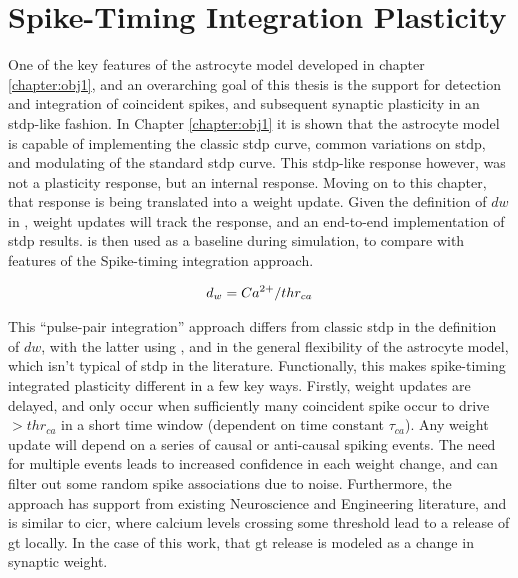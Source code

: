 
\section{Spike-Timing Integration Plasticity}

One of the key features of the astrocyte model developed in chapter
\ref{chapter:obj1}, and an overarching goal of this thesis is the support for
detection and integration of coincident spikes, and subsequent synaptic
plasticity in an \gls{stdp}-like fashion. In Chapter \ref{chapter:obj1} it is shown
that the astrocyte model is capable of
implementing the classic \gls{stdp} curve, common variations on \gls{stdp}, and modulating
of the standard \gls{stdp} curve. This \gls{stdp}-like response however, was not a
plasticity response, but an internal \ca response. Moving on to this chapter,
that \ca response is being translated into a weight update. Given the definition
of $dw$ in , weight updates will track the \ca
response, and an end-to-end implementation of \gls{stdp}
results.  is then used as a baseline during simulation, to
compare with features of the Spike-timing integration approach.

\begin{align}
  d_w = Ca^{2+} / thr_{ca}  \label{eq:dw-classic}
\end{align}

This ``pulse-pair integration'' approach differs from classic \gls{stdp} in the
definition of $dw$, with the latter using , and in the
general flexibility of the astrocyte model, which isn't typical of \gls{stdp} in the
literature. Functionally, this makes spike-timing integrated plasticity different
in a few key ways. Firstly, weight updates are delayed, and
only occur when sufficiently many coincident spike occur to drive \ca
$>thr_{ca}$ in a short time window (dependent on time constant $\tau_{ca}$). Any
weight update will depend on a series of 
causal or anti-causal spiking events. The need for multiple events leads to 
increased confidence in each weight change, and can filter out some random spike
associations due to noise.  Furthermore, the approach has support from existing
Neuroscience and Engineering literature, and is similar to \gls{cicr}, where calcium
levels crossing some threshold lead to a release of \gls{gt} locally. In
the case of this work, that \gls{gt} release is modeled as a change in
synaptic weight.

